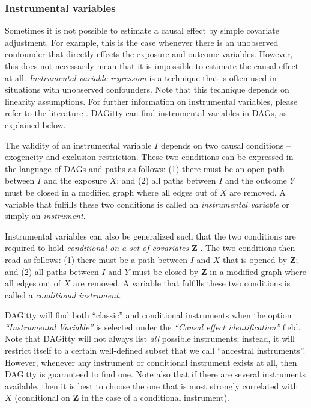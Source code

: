 \documentclass[a4paper]{article} %
\newcommand{\pp}{{\sc DAG}itty\xspace}
\newcommand{\action}[1]{\emph{``#1''}}
\begin{document}
\subsubsection{Instrumental variables}

Sometimes it is not possible to estimate a causal effect by simple covariate adjustment.
For example, this is the case whenever there is an unobserved confounder that directly
effects the exposure and outcome variables. However, this does not necessarily 
mean that it is impossible to estimate the causal effect at all. 
\emph{Instrumental variable regression} is a technique that is 
often used in situations with unobserved confounders.
Note that this technique depends on linearity assumptions. For further information
on instrumental variables, please refer to the literature \cite{AngristIR96,imbens14}. 
\pp can find instrumental variables in DAGs, as explained below. 

The validity of an instrumental variable $I$ depends on two causal conditions -- 
exogeneity and exclusion restriction. These two conditions can be expressed 
in the language of DAGs and paths as follows: (1) there must be an open path between 
$I$ and the exposure $X$; and (2) all paths between $I$ and the outcome $Y$ must be
closed in a modified graph where all edges out of $X$ are removed. 
A variable that fulfills these two conditions is called an \emph{instrumental variable}
or simply an \emph{instrument}.

Instrumental variables can also be generalized such that the two conditions are required
to hold \emph{conditional on a set of covariates} $\mathbf{Z}$ \cite{BritoPearlUAI02}. 
The two conditions then read as follows: 
(1) there must be a path between 
$I$ and $X$ that is opened by $\mathbf{Z}$; and (2) 
all paths between $I$ and $Y$ must be closed by $\mathbf{Z}$ 
in a modified graph where all edges out of $X$ are removed. 
A variable that fulfills these two conditions is called a
\emph{conditional instrument}.

\pp will find both ``classic'' and conditional instruments when the option 
\action{Instrumental Variable} is selected under the \action{Causal effect identification} 
field. Note that \pp will not always list \emph{all} possible instruments;
instead, it will restrict itself to a certain well-defined subset that we call 
``ancestral instruments''. However, whenever any instrument or conditional instrument
exists at all, then \pp is guaranteed to find one. Note also that if there are several
instruments available, then it is best to choose the one that is most strongly
correlated with $X$ (conditional on $\mathbf{Z}$ in the case of a conditional instrument).
\end{document}
